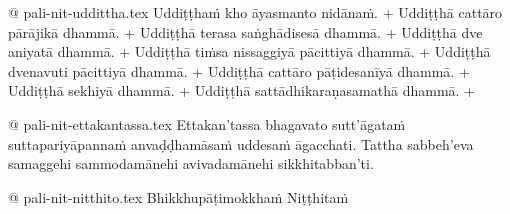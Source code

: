 @ pali-nit-uddittha.tex
Uddiṭṭhaṁ kho āyasmanto nidānaṁ. +
Uddiṭṭhā cattāro pārājikā dhammā. +
Uddiṭṭhā terasa saṅghādisesā dhammā. +
Uddiṭṭhā dve aniyatā dhammā. +
Uddiṭṭhā tiṁsa nissaggiyā pācittiyā dhammā. +
Uddiṭṭhā dvenavuti pācittiyā dhammā. +
Uddiṭṭhā cattāro pāṭidesanīyā dhammā. +
Uddiṭṭhā sekhiyā dhammā. +
Uddiṭṭhā sattādhikaraṇasamathā dhammā. +

@ pali-nit-ettakantassa.tex
Ettakan’tassa bhagavato sutt’āgataṁ suttapariyāpannaṁ anvaḍḍhamāsaṁ uddesaṁ āgacchati. Tattha sabbeh’eva samaggehi sammodamānehi avivadamānehi sikkhitabban’ti.

@ pali-nit-nitthito.tex
Bhikkhupāṭimokkhaṁ Niṭṭhitaṁ
